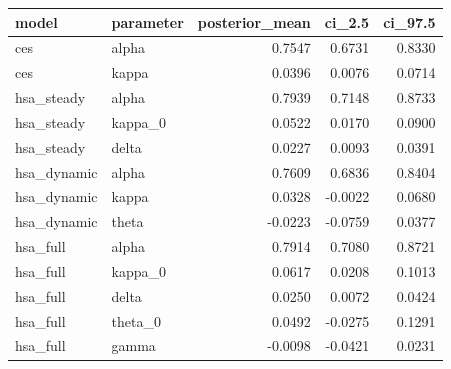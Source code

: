 \begin{tabular}{llrrr}
\toprule
model & parameter & posterior\_mean & ci\_2.5 & ci\_97.5 \\
\midrule
ces & alpha & 0.7547 & 0.6731 & 0.8330 \\
ces & kappa & 0.0396 & 0.0076 & 0.0714 \\
hsa\_steady & alpha & 0.7939 & 0.7148 & 0.8733 \\
hsa\_steady & kappa\_0 & 0.0522 & 0.0170 & 0.0900 \\
hsa\_steady & delta & 0.0227 & 0.0093 & 0.0391 \\
hsa\_dynamic & alpha & 0.7609 & 0.6836 & 0.8404 \\
hsa\_dynamic & kappa & 0.0328 & -0.0022 & 0.0680 \\
hsa\_dynamic & theta & -0.0223 & -0.0759 & 0.0377 \\
hsa\_full & alpha & 0.7914 & 0.7080 & 0.8721 \\
hsa\_full & kappa\_0 & 0.0617 & 0.0208 & 0.1013 \\
hsa\_full & delta & 0.0250 & 0.0072 & 0.0424 \\
hsa\_full & theta\_0 & 0.0492 & -0.0275 & 0.1291 \\
hsa\_full & gamma & -0.0098 & -0.0421 & 0.0231 \\
\bottomrule
\end{tabular}
